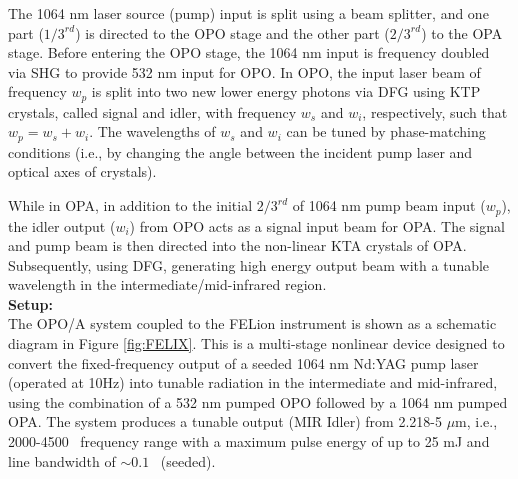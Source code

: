 The 1064 nm laser source (pump) input is split using a beam splitter, and one part ($1/3^{rd}$) is directed to the OPO 
stage and the other part ($2/3^{rd}$) to the OPA stage. Before entering the OPO stage, the 1064 nm input is frequency 
doubled via SHG to provide 532 nm input for OPO. In OPO, the input laser beam of frequency $w_p$ is split into two new 
lower energy photons via DFG using KTP crystals, called signal and idler, with frequency $w_s$ and $w_i$, respectively, 
such that $w_p = w_s + w_i$. The wavelengths of $w_s$ and $w_i$ can be tuned by phase-matching conditions (i.e., by 
changing the angle between the incident pump laser and optical axes of crystals). 

While in OPA, in addition to the initial $2/3^{rd}$ of 1064 nm pump beam input ($w_p$), 
the idler output ($w_i$) from OPO acts as a signal input beam for OPA. The signal and pump beam is then directed into
the non-linear KTA crystals of OPA. Subsequently, using DFG, generating high energy output beam 
with a tunable wavelength in the intermediate/mid-infrared region.\\

\noindent \textbf{Setup:}\\

The OPO/A system coupled to the FELion instrument is shown as a schematic diagram in Figure \ref{fig:FELIX}. This is a multi-stage nonlinear device designed to convert the fixed-frequency output of a seeded 1064 nm Nd:YAG pump laser (operated at 10Hz) into tunable radiation in the intermediate and mid-infrared, using the combination of a 532 nm pumped OPO followed by a 1064 nm pumped OPA. The system produces a tunable output (MIR Idler) from 2.218-5 $\mu$m, i.e., 2000-4500 \wn\ frequency range with a maximum pulse energy of up to 25 mJ and line bandwidth of $\sim 0.1$ \wn\ (seeded).
